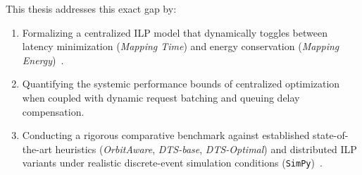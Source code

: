 This thesis addresses this exact gap by:
\begin{enumerate}
    \item Formalizing a centralized ILP model that dynamically toggles between latency minimization (\textit{Mapping Time}) and energy conservation (\textit{Mapping Energy})~\cite{icdcs_satellite_2025}.
    \item Quantifying the systemic performance bounds of centralized optimization when coupled with dynamic request batching and queuing delay compensation.
    \item Conducting a rigorous comparative benchmark against established state-of-the-art heuristics (\textit{OrbitAware}, \textit{DTS-base}, \textit{DTS-Optimal}) and distributed ILP variants under realistic discrete-event simulation conditions (\texttt{SimPy})~\cite{simpy2023, icdcs_satellite_2025}.
\end{enumerate}